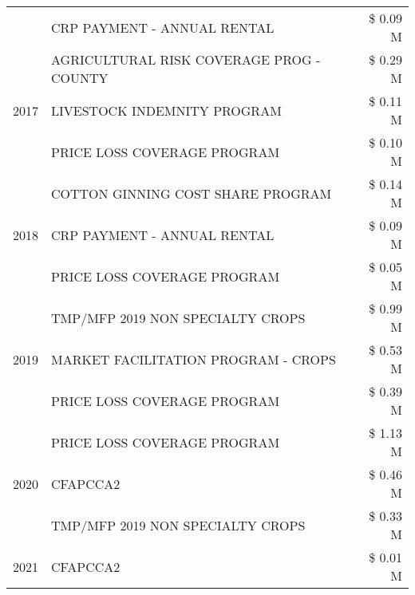 \begin{tabular}{llr}
 & CRP PAYMENT - ANNUAL RENTAL & \$ 0.09 M \\
\cline{1-3}
\multirow[t]{3}{*}{2017} & AGRICULTURAL RISK COVERAGE PROG - COUNTY & \$ 0.29 M \\
 & LIVESTOCK INDEMNITY PROGRAM & \$ 0.11 M \\
 & PRICE LOSS COVERAGE PROGRAM & \$ 0.10 M \\
\cline{1-3}
\multirow[t]{3}{*}{2018} & COTTON GINNING COST SHARE PROGRAM & \$ 0.14 M \\
 & CRP PAYMENT - ANNUAL RENTAL & \$ 0.09 M \\
 & PRICE LOSS COVERAGE PROGRAM & \$ 0.05 M \\
\cline{1-3}
\multirow[t]{3}{*}{2019} & TMP/MFP 2019 NON SPECIALTY CROPS & \$ 0.99 M \\
 & MARKET FACILITATION PROGRAM - CROPS & \$ 0.53 M \\
 & PRICE LOSS COVERAGE PROGRAM & \$ 0.39 M \\
\cline{1-3}
\multirow[t]{3}{*}{2020} & PRICE LOSS COVERAGE PROGRAM & \$ 1.13 M \\
 & CFAPCCA2 & \$ 0.46 M \\
 & TMP/MFP 2019 NON SPECIALTY CROPS & \$ 0.33 M \\
\cline{1-3}
2021 & CFAPCCA2 & \$ 0.01 M \\
\cline{1-3}
\bottomrule
\end{tabular}
